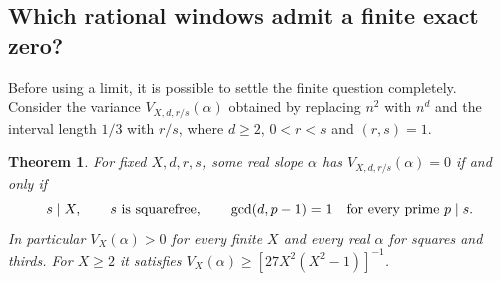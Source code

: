 \documentclass[11pt,a4paper,oneside,openany]{report}
\newtheorem{theorem}{Theorem}[section]
\theoremstyle{remark}\newtheorem{remark}[theorem]{Remark}
\numberwithin{equation}{section}
\begin{document}
\subsection{Which rational windows admit a finite exact zero?}
Before using a limit, it is possible to settle the finite question completely. Consider the variance $V_{X,d,r/s}(\alpha)$ obtained by replacing $n^2$ with $n^d$ and the interval length $1/3$ with $r/s$, where $d\ge2$, $0<r<s$ and $(r,s)=1$.
\begin{theorem}\label{ch5:finite:zero}
For fixed $X,d,r,s$, some real slope $\alpha$ has $V_{X,d,r/s}(\alpha)=0$ if and only if
\[
 s\mid X,\qquad s\ \hbox{is squarefree},\qquad
 \gcd(d,p-1)=1\quad\hbox{for every prime }p\mid s .
\]
In particular $V_X(\alpha)>0$ for every finite $X$ and every real $\alpha$ for squares and thirds. For $X\ge2$ it satisfies $V_X(\alpha)\ge[27 X^2(X^2-1)]^{-1}$.
\end{theorem}
\end{document}

